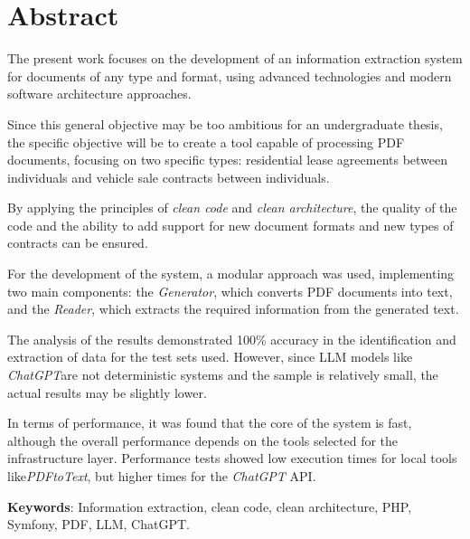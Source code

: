 \newpage
\section*{Abstract}
The present work focuses on the development of an information extraction system for documents of any type and format,
using advanced technologies and modern software architecture approaches.

Since this general objective may be too ambitious for an undergraduate thesis, the specific objective will be to create
a tool capable of processing PDF documents, focusing on two specific types: residential lease agreements between
individuals and vehicle sale contracts between individuals.

By applying the principles of \textit{clean code} and \textit{clean architecture}, the quality of the code and the
ability to add support for new document formats and new types of contracts can be ensured.

For the development of the system, a modular approach was used, implementing two main components: the
\textit{Generator}, which converts PDF documents into text, and the \textit{Reader}, which extracts the required
information from the generated text.

The analysis of the results demonstrated 100\% accuracy in the identification and extraction of data for the test
sets used.
However, since LLM models like \textit{ChatGPT}are not deterministic systems and the sample is relatively small, the
actual results may be slightly lower.

In terms of performance, it was found that the core of the system is fast, although the overall performance depends on
the tools selected for the infrastructure layer.
Performance tests showed low execution times for local tools like\textit{PDFtoText}, but higher times for the
\textit{ChatGPT} API.



\vspace{1cm}

\textbf{Keywords}: Information extraction, clean code, clean architecture, PHP, Symfony, PDF, LLM, ChatGPT.

